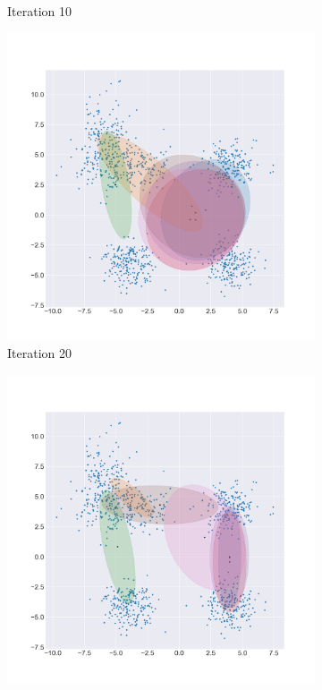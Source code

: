 \documentclass[letterpaper]{article}
\begin{document}
\begin{figure}[H]
\begin{subfigure}[b]{0.25\linewidth}
    \caption{Iteration 10}
  \end{subfigure}
 \begin{subfigure}[b]{0.25\linewidth}
   \includegraphics[width=\linewidth]{outputs/simulation/iter_20.png}
    \caption{Iteration 20}
  \end{subfigure}
  \begin{subfigure}[b]{0.25\linewidth}
    \includegraphics[width=\linewidth]{outputs/simulation/iter_30.png}

\end{subfigure}
\end{figure}
\end{document}
